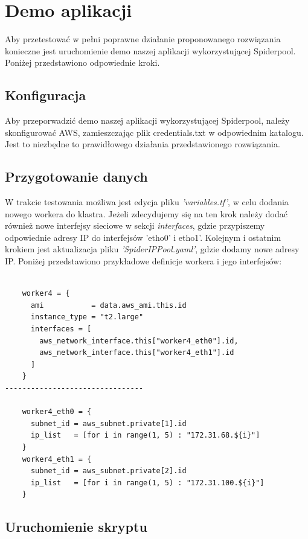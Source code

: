 \documentclass[onecolumn,12pt]{article}
\begin{document}
\section{Demo aplikacji}
Aby przetestować w pełni poprawne działanie proponowanego rozwiązania konieczne jest uruchomienie
demo naszej aplikacji wykorzystującej Spiderpool. Poniżej przedstawiono odpowiednie kroki.

\subsection{Konfiguracja}

Aby przeporwadzić demo naszej aplikacji wykorzystującej Spiderpool, należy skonfigurować AWS, 
zamieszczając plik credentials.txt w odpowiednim katalogu. Jest to niezbędne to prawidłowego działania
przedstawionego rozwiązania. 

\subsection{Przygotowanie danych}

W trakcie testowania możliwa jest edycja pliku \textit{'variables.tf'}, w celu dodania nowego workera do klastra. Jeżeli zdecydujemy się na ten krok należy dodać również nowe interfejsy sieciowe w sekcji \textit{interfaces}, gdzie przypiszemy odpowiednie adresy IP do interfejsów 'etho0' i etho1'. Kolejnym 
i ostatnim krokiem jest aktualizacja pliku \textit{'SpiderIPPool.yaml'}, gdzie dodamy nowe adresy IP.
Poniżej przedstawiono przykładowe definicje workera i jego interfejsów:

\begin{lstlisting}[style=yaml]

    worker4 = {
      ami           = data.aws_ami.this.id
      instance_type = "t2.large"
      interfaces = [
        aws_network_interface.this["worker4_eth0"].id,
        aws_network_interface.this["worker4_eth1"].id
      ]
    }
--------------------------------

    worker4_eth0 = {
      subnet_id = aws_subnet.private[1].id
      ip_list   = [for i in range(1, 5) : "172.31.68.${i}"]
    }
    worker4_eth1 = {
      subnet_id = aws_subnet.private[2].id
      ip_list   = [for i in range(1, 5) : "172.31.100.${i}"]
    }
\end{lstlisting}

\subsection{Uruchomienie skryptu}
\end{document}
